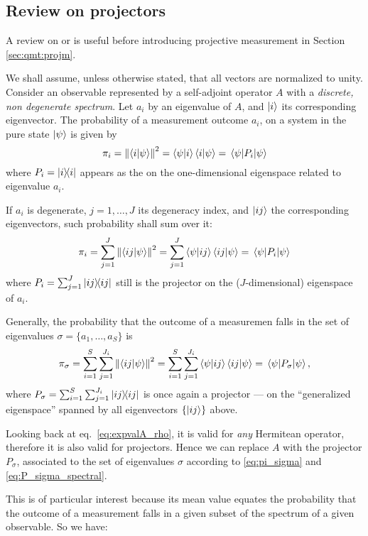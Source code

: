 \subsection{Review on projectors}

A review on  or 
is useful before introducing projective measurement
in Section \ref{sec:qmt:projm}.

We shall assume, unless otherwise stated, that all vectors are
normalized to unity.
Consider an observable represented by a self-adjoint operator $A$
with a 
\emph{discrete, non degenerate spectrum}.
Let $a_i$ by an eigenvalue of $A$, and $\ket{i}$ its corresponding eigenvector.
The probability of a measurement
outcome $a_i$,
on a system in the pure state $\ket{\psi}$
is given by
$$
\pi_{i} = \norm{\braket{i}{\psi}}^2
        = \bra{\psi}\ket{i}\bra{i}\ket{\psi}
        = \mel{\psi}{P_{i}}{\psi}
$$
where $P_{i} = \ketbra{i}$ appears as the  on the
one-dimensional ei\-gen\-space related to eigenvalue  $a_i$.

If $a_i$ is degenerate, $j = 1, \dots, J$ its degeneracy index, and $\ket{ij}$ the corresponding eigenvectors,
such probability shall sum over it:
$$
\pi_{i} = \sum_{j=1}^{J}\norm{\braket{ij}{\psi}}^2
        = \sum_{j=1}^{J}\bra{\psi}\ket{ij}\bra{ij}\ket{\psi}
        = \mel{\psi}{P_{i}}{\psi}
$$
where $P_{i} = \sum_{j=1}^{J}\ketbra{ij}$
still is the projector on the
($J$-dimensional) eigenspace of $a_i$.

Generally, the probability that the outcome of a measuremen falls in
the set of eigenvalues $\sigma = \{a_{1}, \dots, a_{S}\}$ is
\begin{equation}\label{eq:pi_sigma}
\pi_{\sigma}  = \sum_{i=1}^{S}\sum_{j=1}^{J_{i}}\norm{\braket{ij}{\psi}}^2
              = \sum_{i=1}^{S}\sum_{j=1}^{J_{i}}\bra{\psi}\ket{ij}\bra{ij}\ket{\psi}
              = \mel{\psi}{P_{\sigma}}{\psi}
              ,
\end{equation}
where $P_{\sigma} = \sum_{i=1}^{S}\sum_{j=1}^{J_{i}}\ketbra{ij}$
is once again a projector --- on the ``generalized eigenspace'' spanned by all
eigenvectors $\{\ket{ij}\}$ above.

Looking back at eq.~\eqref{eq:expvalA_rho},
it is valid for \emph{any} Hermitean operator,
therefore it is also valid for projectors.
Hence we can replace $A$ with the projector $P_{\sigma}$,
associated to the set of eigenvalues $\sigma$
according to \eqref{eq:pi_sigma} and \eqref{eq:P_sigma_spectral}.

This is of particular interest
because its mean value equates the probability that the outcome of a measurement
falls in a given subset of the spectrum of a given observable.
So we have:

